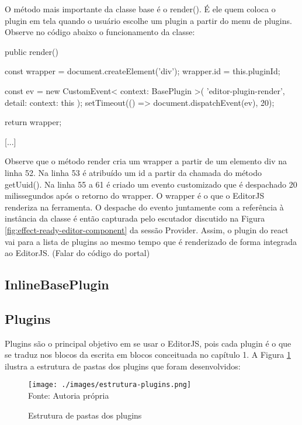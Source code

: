O método mais importante da classe base é o render(). É ele quem coloca o plugin
em tela quando o usuário escolhe um plugin a partir do menu de plugins.
Observe no código abaixo o funcionamento da classe:

\begin{Codeaf45002cf0dc45c69f990afd7cdf6aa5}
[...]
public render(){
    const wrapper = document.createElement('div');
    wrapper.id = this.pluginId;

    const ev = new CustomEvent<{ context: BasePlugin }>(
        'editor-plugin-render', {
            detail: {
                context: this
            }
        }
    );
    setTimeout(() => document.dispatchEvent(ev), 20);

    return wrapper;
}
[...]
\end{Codeaf45002cf0dc45c69f990afd7cdf6aa5}

Observe que o método render cria um wrapper a partir de um elemento
div na linha 52. Na linha 53 é atribuído um id a partir da chamada do método
getUuid(). Na linha 55 a 61 é criado um evento customizado que é despachado
20 milissegundos após o retorno do wrapper.
O wrapper é o que o EditorJS renderiza na ferramenta. O despache do evento
juntamente com a referência à instância da classe é então capturada pelo
escutador discutido na
Figura \ref{fig:effect-ready-editor-component}
da sessão Provider. Assim, o plugin do react vai para a lista de plugins ao mesmo
tempo que é renderizado de forma integrada ao EditorJS.
(Falar do código do portal)

\subsection{InlineBasePlugin}

\subsection{Plugins}

Plugins são o principal objetivo em se usar o EditorJS, pois cada plugin é o que
se traduz nos blocos da escrita em blocos conceituada no capítulo 1.
A
Figura \ref{fig:estrutura-plugins}
ilustra a estrutura de pastas dos plugins que foram desenvolvidos:

\begin{figure}[H]
    \centering
    \caption{Estrutura de pastas dos plugins}
    \texttt{[image: ./images/estrutura-plugins.png]}
    \label{fig:estrutura-plugins} \\
    \textnormal{\fontsize{10pt}{12pt}Fonte: Autoria própria}
\end{figure}

